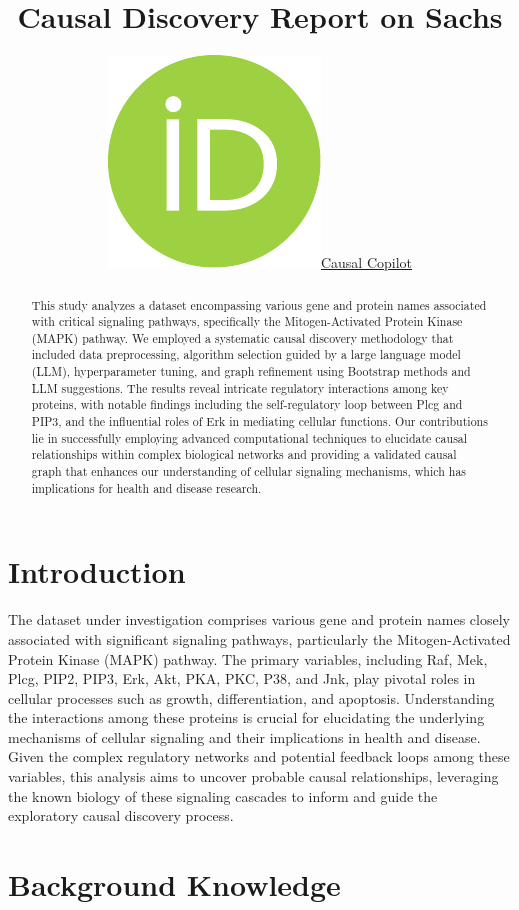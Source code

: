 \documentclass{article}
\title{Causal Discovery Report on Sachs}
\author{ \href{https://orcid.org/0000-0000-0000-0000}{\includegraphics[scale=0.06]{postprocess/context/orcid.pdf}\hspace{1mm}Causal Copilot}}
\begin{document}
\maketitle

\begin{abstract}
This study analyzes a dataset encompassing various gene and protein names associated with critical signaling pathways, specifically the Mitogen-Activated Protein Kinase (MAPK) pathway. We employed a systematic causal discovery methodology that included data preprocessing, algorithm selection guided by a large language model (LLM), hyperparameter tuning, and graph refinement using Bootstrap methods and LLM suggestions. The results reveal intricate regulatory interactions among key proteins, with notable findings including the self-regulatory loop between Plcg and PIP3, and the influential roles of Erk in mediating cellular functions. Our contributions lie in successfully employing advanced computational techniques to elucidate causal relationships within complex biological networks and providing a validated causal graph that enhances our understanding of cellular signaling mechanisms, which has implications for health and disease research.
\end{abstract}


\raggedbottom
\section{Introduction}
The dataset under investigation comprises various gene and protein names closely associated with significant signaling pathways, particularly the Mitogen-Activated Protein Kinase (MAPK) pathway. The primary variables, including Raf, Mek, Plcg, PIP2, PIP3, Erk, Akt, PKA, PKC, P38, and Jnk, play pivotal roles in cellular processes such as growth, differentiation, and apoptosis. Understanding the interactions among these proteins is crucial for elucidating the underlying mechanisms of cellular signaling and their implications in health and disease. Given the complex regulatory networks and potential feedback loops among these variables, this analysis aims to uncover probable causal relationships, leveraging the known biology of these signaling cascades to inform and guide the exploratory causal discovery process.

\section{Background Knowledge}
\end{document}
